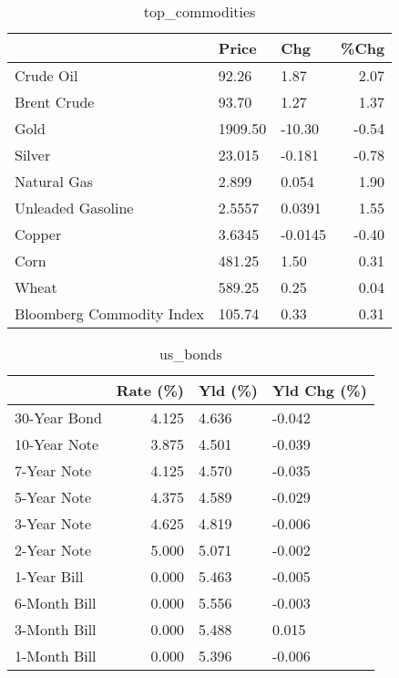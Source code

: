\documentclass{article}%
\begin{document}
\begin{table}[htbp]%
\caption{top\_commodities}%
\centering%
\begin{adjustbox}{width=1\textwidth}%
\begin{tabular}{lllr}
\toprule
                          &   Price &     Chg &  \%Chg \\
\midrule
               Crude Oil  &   92.26 &    1.87 &  2.07 \\
             Brent Crude  &   93.70 &    1.27 &  1.37 \\
                    Gold  & 1909.50 &  -10.30 & -0.54 \\
                  Silver  &  23.015 &  -0.181 & -0.78 \\
             Natural Gas  &   2.899 &   0.054 &  1.90 \\
       Unleaded Gasoline  &  2.5557 &  0.0391 &  1.55 \\
                  Copper  &  3.6345 & -0.0145 & -0.40 \\
                    Corn  &  481.25 &    1.50 &  0.31 \\
                   Wheat  &  589.25 &    0.25 &  0.04 \\
Bloomberg Commodity Index &  105.74 &    0.33 &  0.31 \\
\bottomrule
\end{tabular}
%
\end{adjustbox}%
\end{table}

%


\begin{table}[htbp]%
\caption{us\_bonds}%
\centering%
\begin{adjustbox}{width=1\textwidth}%
\begin{tabular}{lrll}
\toprule
             &  Rate (\%) & Yld (\%) & Yld Chg (\%) \\
\midrule
30-Year Bond &     4.125 &   4.636 &      -0.042 \\
10-Year Note &     3.875 &   4.501 &      -0.039 \\
 7-Year Note &     4.125 &   4.570 &      -0.035 \\
 5-Year Note &     4.375 &   4.589 &      -0.029 \\
 3-Year Note &     4.625 &   4.819 &      -0.006 \\
 2-Year Note &     5.000 &   5.071 &      -0.002 \\
 1-Year Bill &     0.000 &   5.463 &      -0.005 \\
6-Month Bill &     0.000 &   5.556 &      -0.003 \\
3-Month Bill &     0.000 &   5.488 &       0.015 \\
1-Month Bill &     0.000 &   5.396 &      -0.006 \\
\bottomrule
\end{tabular}
%
\end{adjustbox}%
\end{table}
\end{document}
